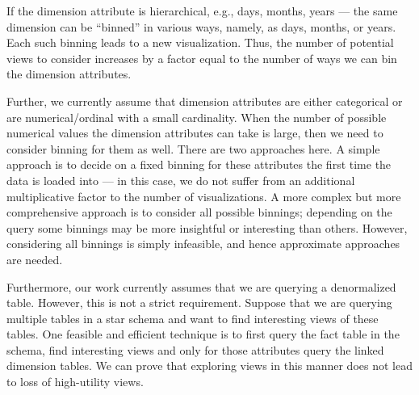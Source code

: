  
 
 
If the dimension attribute is hierarchical, e.g., days, months, years ---
 the same dimension can be ``binned'' in various ways, namely, 
 as days, months, or years. 
 Each such binning leads to a new visualization.
Thus, the number of potential views to consider increases 
by a factor equal to the number of ways we can bin the dimension attributes.

 Further, we currently assume that dimension attributes are either categorical or are
 numerical/ordinal with a small cardinality.
 When the number of possible numerical values the dimension attributes
 can take is large, then we need to consider binning for them as well.
 There are two approaches here. 
  A simple approach is to decide on a fixed binning for these attributes the
 first time the data is loaded into \VizRecDB --- in this case, 
 we do not suffer from an additional multiplicative factor to the number of
 visualizations.
 A more complex but more comprehensive approach is to consider all possible binnings;
 depending on the query some binnings may be more insightful or interesting than others. However, considering all binnings is simply infeasible, and hence
 approximate approaches are needed.

 
 Furthermore, our work currently assumes that we are querying a denormalized
 table.
 However, this is not a strict requirement. 
 Suppose that we are querying multiple tables in a star schema and want to find
 interesting views of these tables.
 One feasible and efficient technique is to first query the fact table in the
 schema, find interesting views and only for those attributes query the
 linked dimension tables.
 We can prove that exploring views in this manner does not lead to loss of
 high-utility views.
